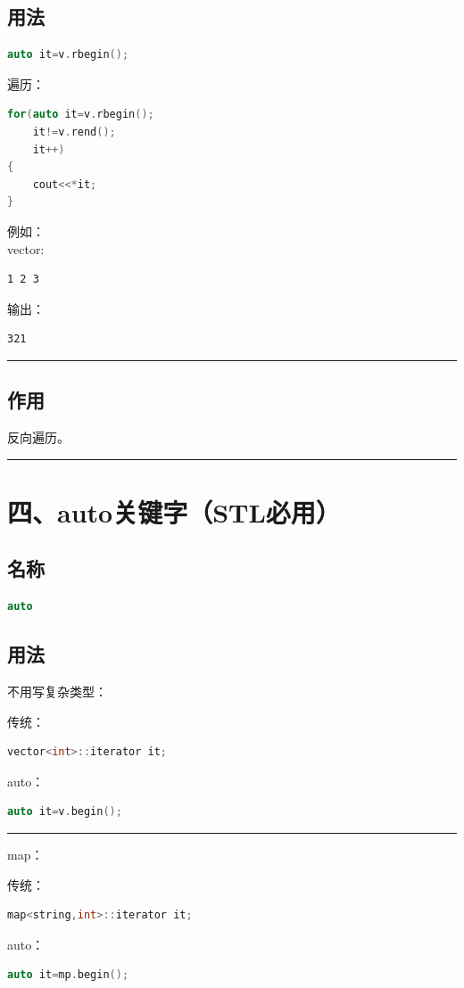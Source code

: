 \documentclass[9pt,twocolumn]{extarticle}
\begin{document}
\subsection{用法}
\begin{lstlisting}[language=C++]
auto it=v.rbegin();
\end{lstlisting}
遍历：
\begin{lstlisting}[language=C++]
for(auto it=v.rbegin();
    it!=v.rend();
    it++)
{
    cout<<*it;
}
\end{lstlisting}
例如：\\
vector:
\begin{lstlisting}
1 2 3
\end{lstlisting}
输出：
\begin{lstlisting}
321
\end{lstlisting}

\noindent\rule{\linewidth}{0.4pt}

\subsection{作用}
反向遍历。

\noindent\rule{\linewidth}{0.4pt}

\section{四、auto关键字（STL必用）}

\subsection{名称}
\begin{lstlisting}[language=C++]
auto
\end{lstlisting}

\subsection{用法}
不用写复杂类型：

传统：
\begin{lstlisting}[language=C++]
vector<int>::iterator it;
\end{lstlisting}
auto：
\begin{lstlisting}[language=C++]
auto it=v.begin();
\end{lstlisting}

\noindent\rule{\linewidth}{0.4pt}

map：

传统：
\begin{lstlisting}[language=C++]
map<string,int>::iterator it;
\end{lstlisting}
auto：
\begin{lstlisting}[language=C++]
auto it=mp.begin();
\end{lstlisting}
\end{document}
